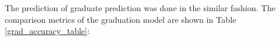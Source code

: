 \documentclass[12pt,english]{report}
\begin{document}

The prediction of graduate prediction was done in the similar fashion. The comparison metrics of the graduation model are shown in Table \ref{grad_accuracy_table}:
\end{document}
